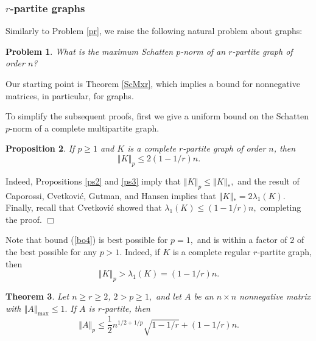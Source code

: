 \documentclass[12pt]{article}%
\newtheorem{theorem}{Theorem}[section]
\newtheorem{problem}[theorem]{Problem}
\newtheorem{proposition}[theorem]{Proposition}
\newenvironment{proof}[1][Proof]{\noindent{\textbf {#1}  }}  {\hfill$\Box$\bigskip}
\begin{document}
\subsubsection{$r$-partite graphs}

Similarly to Problem \ref{pr}, we raise the following natural problem about graphs:

\begin{problem}
\label{Scpr}What is the maximum Schatten $p$-norm of an $r$-partite graph of
order $n$?
\end{problem}

Our starting point is Theorem \ref{ScMxr}, which implies a bound for
nonnegative matrices, in particular, for graphs.

To simplify the subsequent proofs, first we give a uniform bound on the
Schatten $p$-norm of a complete multipartite graph.

\begin{proposition}
\label{pro3}If $p\geq1$ and $K$ is a complete $r$-partite graph of order $n$,
then%
\begin{equation}
\left\Vert K\right\Vert _{p}\leq2\left(  1-1/r\right)  n. \label{bo4}%
\end{equation}

\end{proposition}

\begin{proof}
Indeed, Propositions \ref{ps2} and \ref{ps3} imply that $\left\Vert
K\right\Vert _{p}\leq\left\Vert K\right\Vert _{\ast},$ and the result of
Caporossi, Cvetkovi\'{c}, Gutman, and Hansen \cite{CCGH99} implies that
$\left\Vert K\right\Vert _{\ast}=2\lambda_{1}\left(  K\right)  .$ Finally,
recall that Cvetkovi\'{c} \cite{Cve72} showed that $\lambda_{1}\left(
K\right)  \leq\left(  1-1/r\right)  n,$ completing the proof.
\end{proof}

Note that bound (\ref{bo4}) is best possible for $p=1,$ and is within a factor
of $2$ of the best possible for any $p>1.$ Indeed, if $K$ is a complete
regular $r$-partite graph, then
\[
\left\Vert K\right\Vert _{p}>\lambda_{1}\left(  K\right)  =\left(
1-1/r\right)  n.
\]


\begin{theorem}
\label{Sth2}Let $n\geq r\geq2$, $2>p\geq1,$ and let $A$ be an $n\times n$
nonnegative matrix with $\left\Vert A\right\Vert _{\max}\leq1.$ If $A$ is
$r$-partite, then
\[
\left\Vert A\right\Vert _{p}\leq\frac{1}{2}n^{1/2+1/p}\sqrt{1-1/r}+\left(
1-1/r\right)  n.
\]

\end{theorem}
\end{document}
